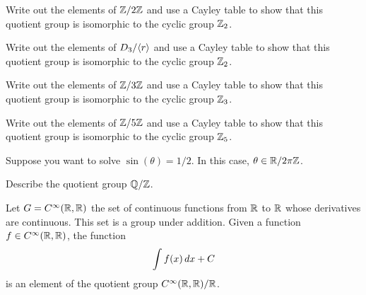 \documentclass{ximera}
\begin{document}
\begin{exercise}
  Write out the elements of $\mathbb Z/2\mathbb Z$ and use a Cayley table to show
  that this quotient group is isomorphic to the cyclic group $\mathbb Z_2$.
\end{exercise}


\begin{exercise}
  Write out the elements of $D_3/\langle r\rangle$ and use a Cayley table to show
  that this quotient group is isomorphic to the cyclic group $\mathbb Z_2$.
\end{exercise}


\begin{exercise}
  Write out the elements of $\mathbb Z/3\mathbb Z$ and use a Cayley table to show
  that this quotient group is isomorphic to the cyclic group $\mathbb Z_3$.
\end{exercise}


\begin{exercise}
  Write out the elements of $\mathbb Z/5\mathbb Z$ and use a Cayley table to show
  that this quotient group is isomorphic to the cyclic group $\mathbb Z_5$.
\end{exercise}


\begin{example}
  Suppose you want to solve $\sin(\theta) = 1/2$. In this case,
  $\theta \in \mathbb R/2\pi\mathbb Z$.
\end{example}

\begin{exercise}
  Describe the quotient group $\mathbb Q/\mathbb Z$.
\end{exercise}

\begin{example}[Antiderivatives]
  Let $G= C^\infty(\mathbb R,\mathbb R)$ the set of continuous functions from $\mathbb R$
  to $\mathbb R$ whose derivatives are continuous. This set is a group under
  addition. Given a function $f\in C^\infty(\mathbb R,\mathbb R)$, the function
  \[
  \int f(x) \, d x + C
  \]
  is an element of the quotient group $C^\infty(\mathbb R,\mathbb R)/\mathbb R$.
\end{example}
\end{document}
